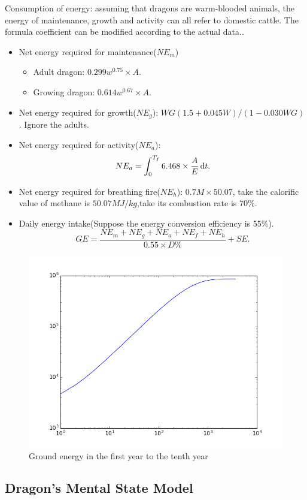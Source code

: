 Consumption of energy: assuming that dragons are warm-blooded animals, the energy of maintenance, growth and activity can all refer to domestic cattle. The formula coefficient can be modified according to the actual data.\cite{consumption-energy}.
\begin{itemize}
    \item Net energy required for maintenance($NE_m$)
    \begin{itemize}
        \item Adult dragon: $0.299w^{0.75}\times A$.
        \item Growing dragon: $0.614w^{0.67}\times A$.
    \end{itemize}
    \item Net energy required for growth($NE_g$): $WG(1.5+0.045W)/(1-0.030WG)$. Ignore the adults.
    \item Net energy required for activity($NE_a$): \[NE_a=\int_0^{T_f}6.468\times\frac{A}{E}\,\mathrm{d} t.\]
    \item Net energy required for breathing fire($NE_h$): $0.7M\times 50.07$, take the calorific value of methane is $50.07MJ/kg$,take its combustion rate is 70\%.
    \item Daily energy intake(Suppose the energy conversion efficiency is 55\%).
    \[GE = \frac{NE_m+NE_g+NE_a+NE_f+NE_h}{0.55\times D\%}+SE.\]
\end{itemize}

\begin{figure}[t]
    \centering
    \includegraphics[width=.5\textwidth]{figures/attri/energy.png}
    \caption{Ground energy in the first year to the tenth year}
    \label{fig:energy}
\end{figure}

\subsection{Dragon's Mental State Model}

